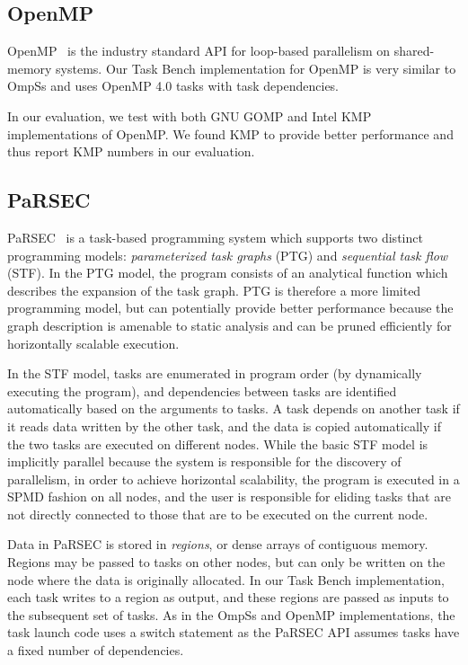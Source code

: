 \subsection{OpenMP}

OpenMP~\cite{OpenMPSpec40} is the industry standard API for loop-based
parallelism on shared-memory systems. Our Task Bench implementation
for OpenMP is very similar to OmpSs and uses OpenMP 4.0 tasks with
task dependencies.

In our evaluation, we test with both GNU GOMP and Intel KMP
implementations of OpenMP. We found KMP to provide better performance
and thus report KMP numbers in our evaluation.

\subsection{PaRSEC}

PaRSEC~\cite{PARSEC13} is a task-based programming system which
supports two distinct programming models: \emph{parameterized task
  graphs} (PTG) and \emph{sequential task flow} (STF). In the PTG
model, the program consists of an analytical function which describes
the expansion of the task graph. PTG is therefore a more limited
programming model, but can potentially provide better performance
because the graph description is amenable to static analysis and can
be pruned efficiently for horizontally scalable execution.

In the STF model, tasks are enumerated in program order (by
dynamically executing the program), and dependencies between tasks are
identified automatically based on the arguments to tasks. A task
depends on another task if it reads data written by the other task,
and the data is copied automatically if the two tasks are executed on
different nodes. While the basic STF model is implicitly parallel
because the system is responsible for the discovery of parallelism, in
order to achieve horizontal scalability, the program is executed in a
SPMD fashion on all nodes, and the user is responsible for eliding
tasks that are not directly connected to those that are to be executed
on the current node.

Data in PaRSEC is stored in \emph{regions}, or dense arrays of
contiguous memory. Regions may be passed to tasks on other nodes, but
can only be written on the node where the data is originally
allocated. In our Task Bench implementation, each task writes to a
region as output, and these regions are passed as inputs to the
subsequent set of tasks. As in the OmpSs and OpenMP implementations,
the task launch code uses a switch statement as the PaRSEC API assumes
tasks have a fixed number of dependencies.

